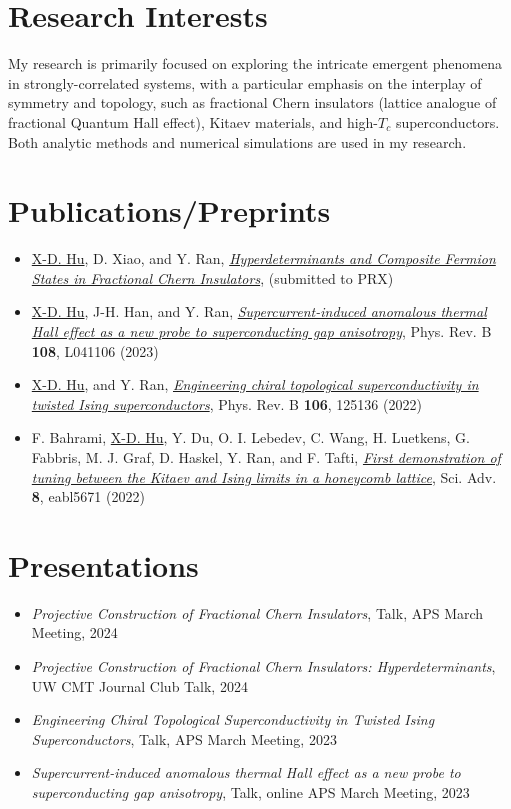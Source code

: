 \documentclass[10pt, letterpaper]{article}
\begin{document}
\section*{Research Interests}
My research is primarily focused on exploring the intricate emergent phenomena in strongly-correlated systems, with a particular emphasis on the interplay of symmetry and topology, such as fractional Chern insulators (lattice analogue of fractional Quantum Hall effect), Kitaev materials, and high-$T_c$ superconductors. Both analytic methods and numerical simulations are used in my research.

\section*{Publications/Preprints}
\begin{itemize}
    \item \underline{X-D. Hu}, D. Xiao, and Y. Ran, \href{https://arxiv.org/abs/2312.00636v2}{\emph{Hyperdeterminants and Composite Fermion States in Fractional Chern Insulators}},  (submitted to PRX)
    \item \underline{X-D. Hu}, J-H. Han, and Y. Ran, \href{https://journals.aps.org/prb/abstract/10.1103/PhysRevB.108.L041106}{\emph{Supercurrent-induced anomalous thermal Hall effect as a new probe to superconducting gap anisotropy}}, Phys. Rev. B \textbf{108}, L041106 (2023)
    \item \underline{X-D. Hu}, and Y. Ran, \href{https://journals.aps.org/prb/abstract/10.1103/PhysRevB.106.125136}{\emph{Engineering chiral topological superconductivity in twisted Ising superconductors}}, Phys. Rev. B \textbf{106}, 125136 (2022)
    \item F. Bahrami, \underline{X-D. Hu}, Y. Du, O. I. Lebedev, C. Wang, H. Luetkens, G. Fabbris, M. J. Graf, D. Haskel, Y. Ran, and F. Tafti, \href{https://www.science.org/doi/full/10.1126/sciadv.abl5671}{\emph{First demonstration of tuning between the Kitaev and Ising limits in a honeycomb lattice}}, Sci. Adv. \textbf{8}, eabl5671 (2022)
\end{itemize}


\section*{Presentations}
\begin{itemize}
    \item \emph{Projective Construction of Fractional Chern Insulators}, Talk, APS March Meeting, 2024
    \item \emph{Projective Construction of Fractional Chern Insulators: Hyperdeterminants}, UW CMT Journal Club Talk, 2024
    \item \emph{Engineering Chiral Topological Superconductivity in Twisted Ising Superconductors}, Talk, APS March Meeting, 2023
    \item \emph{Supercurrent-induced anomalous thermal Hall effect as a new probe to superconducting gap anisotropy}, Talk, online APS March Meeting, 2023
\end{itemize}
\end{document}
